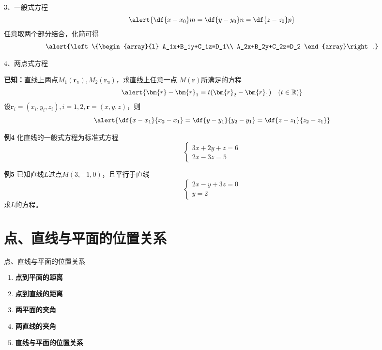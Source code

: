 \begin{frame}{3、一般式方程}
	\linespread{1.2}
	$$
		\alert{\df{x-x_0}m=\df{y-y_0}n=\df{z-z_0}p}
	$$\pause 
	任意取两个部分结合，化简可得
	$$
		\alert{\left\{\begin{array}{l}
			A_1x+B_1y+C_1z=D_1\\
			A_2x+B_2y+C_2z=D_2
		\end{array}\right.}
	$$\pause 
\end{frame}

\begin{frame}{4、两点式方程}
	\linespread{1.2}\pause 
	\pause 
	
	{\bf 已知：}直线上两点$M_1(\bm{r_1}),M_2(\bm{r_2})$，求直线上任意一点
	$M(\bm{r})$所满足的方程\pause 
	$$\alert{\bm{r}-\bm{r}_1=t(\bm{r}_2-\bm{r}_1)\quad (t\in\mathbb{R})}$$\pause 
	设$\bm{r}_i=(x_i,y_i,z_i),i=1,2,\bm{r}=(x,y,z)$，则
	$$\alert{\df{x-x_1}{x_2-x_1}=\df{y-y_1}{y_2-y_1}=\df{z-z_1}{z_2-z_1}}$$
\end{frame}

\begin{frame}
	\linespread{1.2}\pause 
	\begin{exampleblock}{{\bf 例4}\hfill}
		化直线的一般式方程为标准式方程
		$$\left\{\begin{array}{l}
			3x+2y+z=6\\
			2x-3z=5
		\end{array}\right.$$
	\end{exampleblock}\pause 
	\begin{exampleblock}{{\bf 例5}\hfill}
		已知直线$L$过点$M(3,-1,0)$，且平行于直线
		$$\left\{\begin{array}{l}
			2x-y+3z=0\\
			y=2
		\end{array}\right.$$
		求$L$的方程。
	\end{exampleblock}
\end{frame}

\section{点、直线与平面的位置关系}

\begin{frame}{点、直线与平面的位置关系}
	\linespread{1.5}\pause 
	\pause 
	\begin{enumerate}
	  \item {\bf 点到平面的距离}\pause 
	  \item {\bf 点到直线的距离}\pause 
	  \item {\bf 两平面的夹角}\pause 
	  \item {\bf 两直线的夹角}\pause 
	  \item {\bf 直线与平面的位置关系}
	\end{enumerate}
\end{frame}

